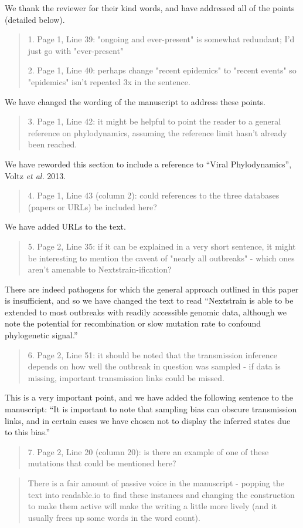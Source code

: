 \documentclass[12pt,a4paper]{article}
\begin{document}
We thank the reviewer for their kind words, and have addressed all of the points (detailed below).

\begin{quote}
1. Page 1, Line 39: "ongoing and ever-present" is somewhat redundant; I'd just go with "ever-present"

2. Page 1, Line 40: perhaps change "recent epidemics" to "recent events" so "epidemics" isn't repeated 3x in the sentence.
\end{quote}

We have changed the wording of the manuscript to address these points. 

\begin{quote}
3. Page 1, Line 42: it might be helpful to point the reader to a general reference on phylodynamics, assuming the reference limit hasn't already been reached.
\end{quote}
We have reworded this section to include a reference to ``Viral Phylodynamics'', Voltz \textit{et al.} 2013.

\begin{quote}
4. Page 1, Line 43 (column 2): could references to the three databases (papers or URLs) be included here?
\end{quote}
We have added URLs to the text.

\begin{quote}
5. Page 2, Line 35: if it can be explained in a very short sentence, it might be interesting to mention the caveat of "nearly all outbreaks" - which ones aren't amenable to Nextstrain-ification?
\end{quote}
There are indeed pathogens for which the general approach outlined in this paper is insufficient, and so we have changed the text to read ``Nextstrain is able to be extended to most outbreaks with readily accessible genomic data, although we note the potential for recombination or slow mutation rate to confound phylogenetic signal.''


\begin{quote}
6. Page 2, Line 51: it should be noted that the transmission inference depends on how well the outbreak in question was sampled - if data is missing, important transmission links could be missed.
\end{quote}
This is a very important point, and we have added the following sentence to the manuscript: ``It is important to note that sampling bias can obscure transmission links, and in certain cases we have chosen not to display the inferred states due to this bias.''

\begin{quote}
7. Page 2, Line 20 (column 20): is there an example of one of these mutations that could be mentioned here?
\end{quote}


\begin{quote}
There is a fair amount of passive voice in the manuscript - popping the text into readable.io to find these instances and changing the construction to make them active will make the writing a little more lively (and it usually frees up some words in the word count).

\end{quote}
\end{document}
